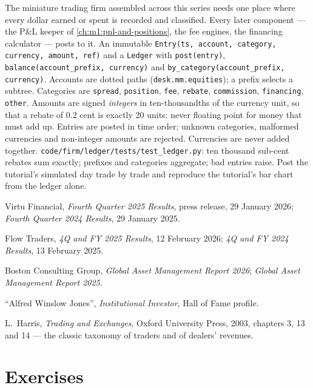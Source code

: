 \begin{build}
 The miniature trading firm assembled across this series
needs one place where every dollar earned or spent is recorded and
classified. Every later component --- the P\&L keeper of
\cref{ch:m1:pnl-and-positions}, the fee engines, the financing calculator ---
posts to it.
 An immutable \texttt{Entry(ts, account, category,
currency, amount, ref)} and a \texttt{Ledger} with \texttt{post(entry)},
\texttt{balance(account\_prefix, currency)} and
\texttt{by\_category(account\_prefix, currency)}. Accounts are dotted paths
(\texttt{desk.mm.equities}); a prefix selects a subtree. Categories are
\texttt{spread}, \texttt{position}, \texttt{fee}, \texttt{rebate},
\texttt{commission}, \texttt{financing}, \texttt{other}.
 Amounts are signed \emph{integers} in ten-thousandths of the
currency unit, so that a rebate of 0.2 cent is exactly 20 units: never
floating point for money that must add up. Entries are posted in time order;
unknown categories, malformed currencies and non-integer amounts are
rejected. Currencies are never added together.
 \texttt{code/firm/ledger/tests/test\_ledger.py}:
ten thousand sub-cent rebates sum exactly; prefixes and categories aggregate;
bad entries raise.
 Post the tutorial's simulated day trade by trade and
reproduce the tutorial's bar chart from the ledger alone.
\end{build}

\begin{omsources}
\item Virtu Financial, \emph{Fourth Quarter 2025 Results}, press release,
29 January 2026; \emph{Fourth Quarter 2024 Results}, 29 January 2025.
\item Flow Traders, \emph{4Q and FY 2025 Results}, 12 February 2026;
\emph{4Q and FY 2024 Results}, 13 February 2025.
\item Boston Consulting Group, \emph{Global Asset Management Report 2026};
\emph{Global Asset Management Report 2025}.
\item ``Alfred Winslow Jones'', \emph{Institutional Investor}, Hall of Fame
profile.
\item L.~Harris, \emph{Trading and Exchanges}, Oxford University Press, 2003,
chapters 3, 13 and 14 --- the classic taxonomy of traders and of dealers'
revenues.
\end{omsources}

\section{Exercises}

